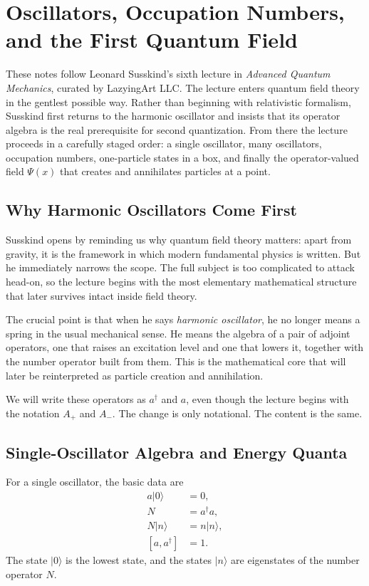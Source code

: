 \chapter{Oscillators, Occupation Numbers, and the First Quantum Field}

These notes follow Leonard Susskind's sixth lecture in \emph{Advanced Quantum Mechanics}, curated by LazyingArt LLC. The lecture enters quantum field theory in the gentlest possible way. Rather than beginning with relativistic formalism, Susskind first returns to the harmonic oscillator and insists that its operator algebra is the real prerequisite for second quantization. From there the lecture proceeds in a carefully staged order: a single oscillator, many oscillators, occupation numbers, one-particle states in a box, and finally the operator-valued field \(\Psi(x)\) that creates and annihilates particles at a point.

\section{Why Harmonic Oscillators Come First}

Susskind opens by reminding us why quantum field theory matters: apart from gravity, it is the framework in which modern fundamental physics is written. But he immediately narrows the scope. The full subject is too complicated to attack head-on, so the lecture begins with the most elementary mathematical structure that later survives intact inside field theory.

The crucial point is that when he says \emph{harmonic oscillator}, he no longer means a spring in the usual mechanical sense. He means the algebra of a pair of adjoint operators, one that raises an excitation level and one that lowers it, together with the number operator built from them. This is the mathematical core that will later be reinterpreted as particle creation and annihilation.

We will write these operators as \(a^\dagger\) and \(a\), even though the lecture begins with the notation \(A_+\) and \(A_-\). The change is only notational. The content is the same.

\section{Single-Oscillator Algebra and Energy Quanta}

For a single oscillator, the basic data are
\begin{align}
a|0\rangle &= 0, \\
N &= a^\dagger a, \\
N|n\rangle &= n|n\rangle, \\
[a,a^\dagger] &= 1.
\end{align}
The state \(|0\rangle\) is the lowest state, and the states \(|n\rangle\) are eigenstates of the number operator \(N\).

